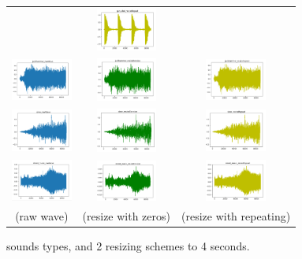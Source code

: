 \documentclass{article}
\begin{document}
\begin{figure}[!htb]
\begin{tabular}{ccc}
        &\includegraphics[width=2cm]{pic/GS_RSRP.png}\\
        \includegraphics[width=2cm]{pic/JH_RW.png}
        &\includegraphics[width=2cm]{pic/JH_RSD.png}
        &\includegraphics[width=2cm]{pic/JH_RSRP.png}\\
        \includegraphics[width=2cm]{pic/SI_RW.png}
        &\includegraphics[width=2cm]{pic/SI_RSD.png}
        &\includegraphics[width=2cm]{pic/SI_RSRP.png}\\
        \includegraphics[width=2cm]{pic/SMC_RW.png}
        &\includegraphics[width=2cm]{pic/SMC_RSD.png}
        &\includegraphics[width=2cm]{pic/SMC_RSRP.png}\\
    (raw wave) & (resize with zeros) &(resize with repeating)
    \end{tabular}
	\caption{sounds types, and 2 resizing schemes to 4 seconds.\label{figure4}}
\end{figure}
\end{document}
